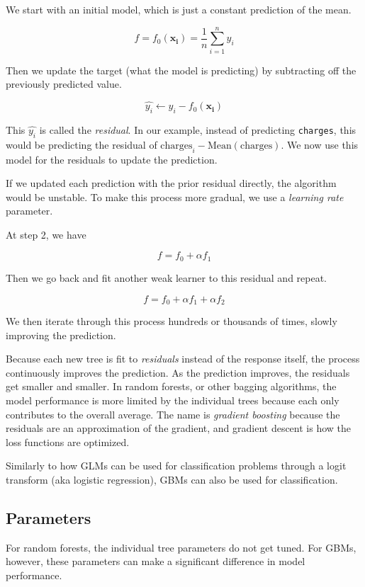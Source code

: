 \documentclass[openany]{book}
\begin{document}
We start with an initial model, which is just a constant prediction of the mean.

\[f = f_0(\mathbf{x_i}) = \frac{1}{n}\sum_{i=1}^ny_i\]

Then we update the target (what the model is predicting) by subtracting off the previously predicted value.

\[ \hat{y_i} \leftarrow y_i - f_0(\mathbf{x_i})\]

This \(\hat{y_i}\) is called the \emph{residual}. In our example, instead of predicting \texttt{charges}, this would be predicting the residual of \(\text{charges}_i - \text{Mean}(\text{charges})\). We now use this model for the residuals to update the prediction.

If we updated each prediction with the prior residual directly, the algorithm would be unstable. To make this process more gradual, we use a \emph{learning rate} parameter.

At step 2, we have

\[f = f_0 + \alpha f_1\]

Then we go back and fit another weak learner to this residual and repeat.

\[f = f_0 + \alpha f_1 + \alpha f_2\]

We then iterate through this process hundreds or thousands of times, slowly improving the prediction.

Because each new tree is fit to \emph{residuals} instead of the response itself, the process continuously improves the prediction. As the prediction improves, the residuals get smaller and smaller. In random forests, or other bagging algorithms, the model performance is more limited by the individual trees because each only contributes to the overall average. The name is \emph{gradient boosting} because the residuals are an approximation of the gradient, and gradient descent is how the loss functions are optimized.

Similarly to how GLMs can be used for classification problems through a logit transform (aka logistic regression), GBMs can also be used for classification.

\hypertarget{parameters}{%
\subsection{Parameters}\label{parameters}}

For random forests, the individual tree parameters do not get tuned. For GBMs, however, these parameters can make a significant difference in model performance.
\end{document}
